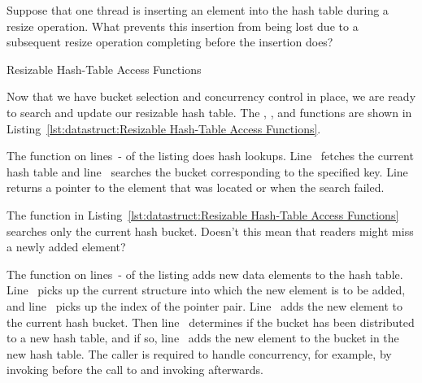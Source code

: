 \QuickQuiz{}
	Suppose that one thread is inserting an element into the
	hash table during a resize operation.
	What prevents this insertion from being lost due to a subsequent
	resize operation completing before the insertion does?
 \QuickQuizEnd

\begin{listing}[tb]

\caption{Resizable Hash-Table Access Functions}
\label{lst:datastruct:Resizable Hash-Table Access Functions}
\end{listing}

Now that we have bucket selection and concurrency control in place,
we are ready to search and update our resizable hash table.
The , , and 
functions are shown in
Listing~\ref{lst:datastruct:Resizable Hash-Table Access Functions}.

\begin{lineref}
The  function on
lines~- of the listing does
hash lookups.
Line~ fetches the current hash table and
line~ searches the bucket corresponding to the
specified key.
Line~ returns a pointer to the element that was located
or  when the search failed.
\end{lineref}

\QuickQuiz{}
	The  function in
	Listing~\ref{lst:datastruct:Resizable Hash-Table Access Functions}
	searches only the current hash bucket.
	Doesn't this mean that readers might miss a newly added
	element?
 \QuickQuizEnd

\begin{lineref}
The  function on lines~- of the listing adds
new data elements to the hash table.
Line~ picks up the current  structure into which the
new element is to be added, and line~ picks up the index of
the pointer pair.
Line~ adds the new element to the current hash bucket.
Then line~ determines if the bucket has been distributed to
a new hash table, and if so,
line~ adds the new element to the bucket in the new hash table.
The caller is required to handle concurrency, for example, by invoking
 before the call to  and invoking
 afterwards.
\end{lineref}

